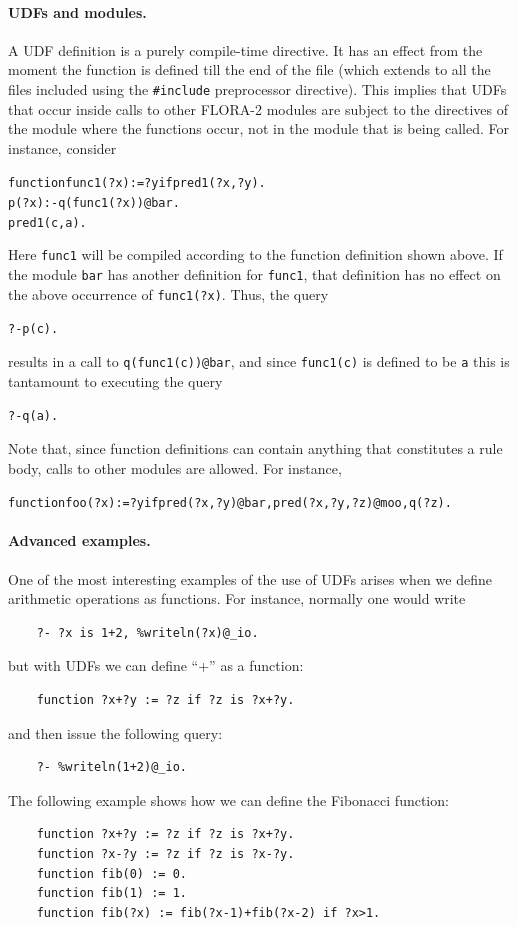 \documentclass[11pt]{article}
\begin{document}
\paragraph{UDFs and modules.}
A UDF definition is a purely compile-time directive. It has an effect from
the moment the function is defined till the end of the file (which extends to
all the files included using the \texttt{\#include} preprocessor
directive). This implies that UDFs that occur inside calls to other FLORA-2
modules are subject to the directives of the module where the functions
occur, not in the module that is being called. For instance, consider
\begin{alltt}
    function func1(?x) := ?y if pred1(?x,?y).
    p(?x) :- q(func1(?x))@bar.
    pred1(c,a).
\end{alltt}
Here \texttt{func1} will be compiled according to the function definition
shown above. If the module \texttt{bar} has another definition for
\texttt{func1}, that definition has no effect on the above occurrence of
\texttt{func1(?x)}.   Thus, the query
\begin{alltt}
?- p(c).
\end{alltt}
results in a call to \texttt{q(func1(c))@bar}, and since \texttt{func1(c)} is
defined to be \texttt{a} this is tantamount to executing the query  
\begin{alltt}
?- q(a).
\end{alltt}
Note that, since function definitions can contain anything that constitutes
a rule body, calls to other modules are allowed. For instance, 
\begin{alltt}
    function foo(?x):=?y if pred(?x,?y)@bar, pred(?x,?y,?z)@moo, q(?z).
\end{alltt}

\paragraph{Advanced examples.}
One of the most interesting examples of the use of UDFs arises when we
define arithmetic operations as functions. For instance, normally one would
write
\begin{verbatim}
    ?- ?x is 1+2, %writeln(?x)@_io.
\end{verbatim}
but with UDFs we can define ``+'' as a function:
\begin{verbatim}
    function ?x+?y := ?z if ?z is ?x+?y.
\end{verbatim}
and then issue the following query:
\begin{verbatim}
    ?- %writeln(1+2)@_io.
\end{verbatim}
The following example shows how we can define the Fibonacci function:
\begin{verbatim}
    function ?x+?y := ?z if ?z is ?x+?y.
    function ?x-?y := ?z if ?z is ?x-?y.
    function fib(0) := 0.
    function fib(1) := 1.
    function fib(?x) := fib(?x-1)+fib(?x-2) if ?x>1.
\end{verbatim}
\end{document}
